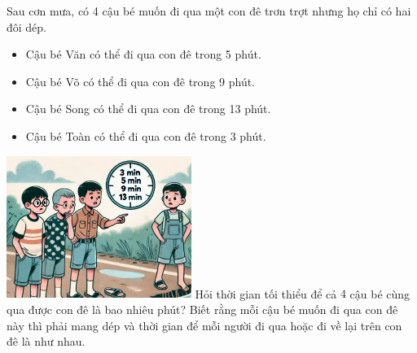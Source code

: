 \begin{ex}%
\immini
{
     Sau cơn mưa, có 4 cậu bé muốn đi qua một con đê trơn trợt nhưng họ chỉ có hai đôi dép.
 \begin{itemize}
 \item Cậu bé Văn có thể đi qua con đê trong 5 phút.
 \item Cậu bé Võ có thể đi qua con đê trong 9 phút.
 \item Cậu bé Song có thể đi qua con đê trong 13 phút.
 \item Cậu bé Toàn có thể đi qua con đê trong 3 phút.
 \end{itemize}
}
{
    \includegraphics[width=6cm]{img/HXN-13-17}
}
Hỏi thời gian tối thiểu để cả $4$ cậu bé cùng qua được con đê là bao nhiêu phút? Biết rằng mỗi cậu bé muốn đi qua con đê này thì phải mang dép và thời gian để mỗi người đi qua hoặc đi về lại trên con đê là như nhau.
 \end{ex}
